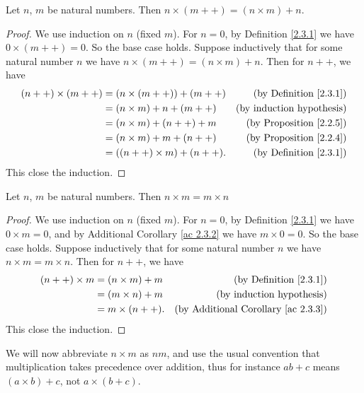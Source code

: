 \begin{additional corollary}\label{ac 2.3.3}
Let \(n\), \(m\) be natural numbers.
Then \(n \times (m++) = (n \times m) + n\).
\end{additional corollary}

\begin{proof}
We use induction on \(n\) (fixed \(m\)).
For \(n = 0\), by Definition \ref{2.3.1} we have \(0 \times (m++) = 0\).
So the base case holds.
Suppose inductively that for some natural number \(n\) we have \(n \times (m++) = (n \times m) + n\).
Then for \(n++\), we have
\begin{align*}
(n++) \times (m++)
&= (n \times (m++)) + (m++) & \text{(by Definition \ref{2.3.1})} \\
&= (n \times m) + n + (m++) & \text{(by induction hypothesis)} \\
&= (n \times m) + (n++) + m & \text{(by Proposition \ref{2.2.5})} \\
&= (n \times m) + m + (n++) & \text{(by Proposition \ref{2.2.4})} \\
&= ((n++) \times m) + (n++). & \text{(by Definition \ref{2.3.1})}
\end{align*}
This close the induction.
\end{proof}

\begin{lemma}\label{2.3.2}
Let \(n\), \(m\) be natural numbers.
Then \(n \times m = m \times n\)
\end{lemma}

\begin{proof}
We use induction on \(n\) (fixed \(m\)).
For \(n = 0\), by Definition \ref{2.3.1} we have \(0 \times m = 0\), and by Additional Corollary \ref{ac 2.3.2} we have \(m \times 0 = 0\).
So the base case holds.
Suppose inductively that for some natural number \(n\) we have \(n \times m = m \times n\).
Then for \(n++\), we have
\begin{align*}
(n++) \times m &= (n \times m) + m & \text{(by Definition \ref{2.3.1})} \\
&= (m \times n) + m & \text{(by induction hypothesis)} \\
&= m \times (n++). & \text{(by Additional Corollary \ref{ac 2.3.3})}
\end{align*}
This close the induction.
\end{proof}

\begin{note}
We will now abbreviate \(n \times m\) as \(nm\), and use the usual convention that multiplication takes precedence over addition, thus for instance \(ab + c\) means \((a \times b) + c\), not \(a \times (b + c)\).
\end{note}

